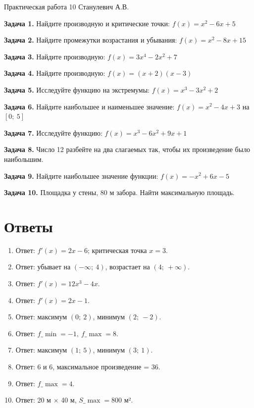 \documentclass{umk-matematika}
\begin{document}
\maketitlepage
    {Практическая работа 10}
    {}
    {Станулевич А.В.}

\textbf{Задача 1.} Найдите производную и критические точки: $f(x) = x^2 - 6x + 5$\par\vspace{10pt}
\textbf{Задача 2.} Найдите промежутки возрастания и убывания: $f(x) = x^2 - 8x + 15$\par\vspace{10pt}
\textbf{Задача 3.} Найдите производную: $f(x) = 3x^4 - 2x^2 + 7$\par\vspace{10pt}
\textbf{Задача 4.} Найдите производную: $f(x) = (x + 2)(x - 3)$\par\vspace{10pt}
\textbf{Задача 5.} Исследуйте функцию на экстремумы: $f(x) = x^3 - 3x^2 + 2$\par\vspace{10pt}
\textbf{Задача 6.} Найдите наибольшее и наименьшее значение: $f(x) = x^2 - 4x + 3$ на $[0;\ 5]$\par\vspace{10pt}
\textbf{Задача 7.} Исследуйте функцию: $f(x) = x^3 - 6x^2 + 9x + 1$\par\vspace{10pt}
\textbf{Задача 8.} Число 12 разбейте на два слагаемых так, чтобы их произведение было наибольшим.\par\vspace{10pt}
\textbf{Задача 9.} Найдите наибольшее значение функции: $f(x) = -x^2 + 6x - 5$\par\vspace{10pt}
\textbf{Задача 10.} Площадка у стены, 80 м забора. Найти максимальную площадь.\par\vspace{10pt}
\newpage
\section*{Ответы}

\begin{enumerate}
  \item Ответ: $f'(x) = 2x - 6$; критическая точка $x = 3$.
  \item Ответ: убывает на $(-\infty;\ 4)$, возрастает на $(4;\ +\infty)$.
  \item Ответ: $f'(x) = 12x^3 - 4x$.
  \item Ответ: $f'(x) = 2x - 1$.
  \item Ответ: максимум $(0;\ 2)$, минимум $(2;\ -2)$.
  \item Ответ: $f\_{\min} = -1,\ f\_{\max} = 8$.
  \item Ответ: максимум $(1;\ 5)$, минимум $(3;\ 1)$.
  \item Ответ: 6 и 6, максимальное произведение = 36.
  \item Ответ: $f\_{\max} = 4$.
  \item Ответ: 20 м $\times$ 40 м, $S\_{\max} = 800$ м².
\end{enumerate}
\end{document}
